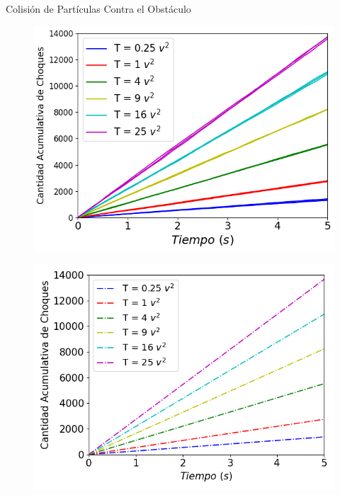\begin{frame}{Colisión de Partículas Contra el Obstáculo}

    \begin{multicols}{2}
        {
            \begin{figure}[H]
                \centering
                \includegraphics[width=0.8\linewidth]{pic/ejer3/b3Tiradas}
                \label{fig:ejer3:btiradas}
            \end{figure}
        }

        {
            \begin{figure}[H]
                \centering
                \includegraphics[width=0.8\linewidth]{pic/ejer3/bSoloSlopes}
                \label{fig:ejer3:bslopes}
            \end{figure}
        }
    \end{multicols}

\end{frame}


